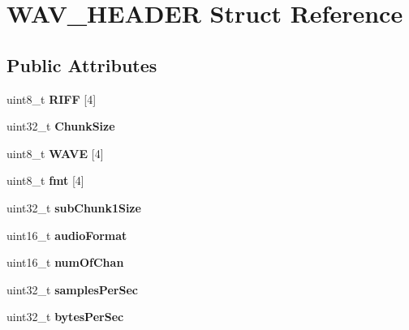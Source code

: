 \hypertarget{structWAV__HEADER}{}\section{W\+A\+V\+\_\+\+H\+E\+A\+D\+ER Struct Reference}
\label{structWAV__HEADER}
\subsection*{Public Attributes}
\begin{DoxyCompactItemize}
\item 
\mbox{\label{structWAV__HEADER_a55f658a3251f57fce065d70b49674aca}} 
uint8\+\_\+t {\bfseries R\+I\+FF} \mbox{[}4\mbox{]}
\item 
\mbox{\label{structWAV__HEADER_ae62522c0ffb2e00012e139c8ad257e75}} 
uint32\+\_\+t {\bfseries Chunk\+Size}
\item 
\mbox{\label{structWAV__HEADER_a71254eeefd2b59351ddf0f5112bc775d}} 
uint8\+\_\+t {\bfseries W\+A\+VE} \mbox{[}4\mbox{]}
\item 
\mbox{\label{structWAV__HEADER_a819430d936a6432f035f6463101d1747}} 
uint8\+\_\+t {\bfseries fmt} \mbox{[}4\mbox{]}
\item 
\mbox{\label{structWAV__HEADER_a0ebd29e37ead4b83d9bbdacabddf9310}} 
uint32\+\_\+t {\bfseries sub\+Chunk1\+Size}
\item 
\mbox{\label{structWAV__HEADER_a9dcf88f2ec36de79463d5d8440f9a690}} 
uint16\+\_\+t {\bfseries audio\+Format}
\item 
\mbox{\label{structWAV__HEADER_aa76faa2952f98f11057d46aaf08544e1}} 
uint16\+\_\+t {\bfseries num\+Of\+Chan}
\item 
\mbox{\label{structWAV__HEADER_aad9ef2c07c75e7ed0bfd90d950254b76}} 
uint32\+\_\+t {\bfseries samples\+Per\+Sec}
\item 
\mbox{\label{structWAV__HEADER_accb4c88131a40690f2dc4c96f71af98b}} 
uint32\+\_\+t {\bfseries bytes\+Per\+Sec}

\end{DoxyCompactItemize}
